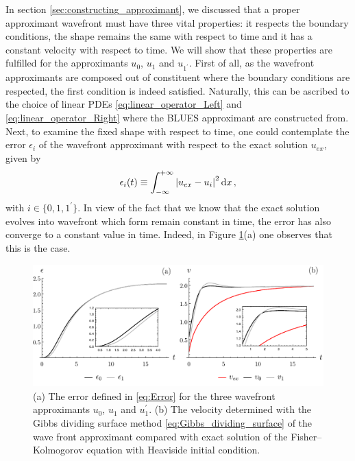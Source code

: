 \documentclass[amsmath,amssymb,amsfonts,aps,pre,preprint,superscriptaddress,bibnotes,showpacs,showkeys,longbibliography]{revtex4-1}
\begin{document}
In section \ref{sec:constructing_approximant}, we discussed that a proper approximant wavefront must have three vital properties: it respects the boundary conditions, the shape remains the same with respect to time and it has a constant velocity with respect to time. We will show that these properties are fulfilled for the approximants $u_0$, $u_1$ and $u_{1^\prime}$. First of all, as the wavefront approximants are composed out of constituent where the boundary conditions are respected, the first condition is indeed satisfied. Naturally, this can be ascribed to the choice of linear PDEs \eqref{eq:linear_operator_Left} and \eqref{eq:linear_operator_Right} where the BLUES approximant are constructed from. Next, to examine the fixed shape with respect to time, one could contemplate the error $\epsilon_i$ of the wavefront approximant with respect to the exact solution $u_{ex}$, given by
\begin{align}\label{eq:Error}
    \epsilon_i(t) \equiv \int_{-\infty}^{+\infty}  \abs{u_{ex}-u_i}^2\dd{x},
\end{align}
with $i\in \{0,1,1^\prime \}$. In view of the fact that we know that the exact solution evolves into wavefront which form remain constant in time, the error has also converge to a constant value in time. Indeed, in Figure \ref{fig:ErrorVelocityGrid}(a) one observes that this is the case. 
\begin{figure}[t]
    \centering
    \includegraphics[width=\linewidth]{Figures/ErrorVelocityGrid.pdf}
    \caption{(a) The error defined in \eqref{eq:Error} for the three wavefront approximants $u_0$, $u_1$ and $u_1^\prime$. (b) The velocity determined with the Gibbs dividing surface method \eqref{eq:Gibbs_dividing_surface} of the wave front approximant compared with exact solution of the Fisher–Kolmogorov equation with Heaviside initial condition. }
    \label{fig:ErrorVelocityGrid}
\end{figure}
\end{document}
